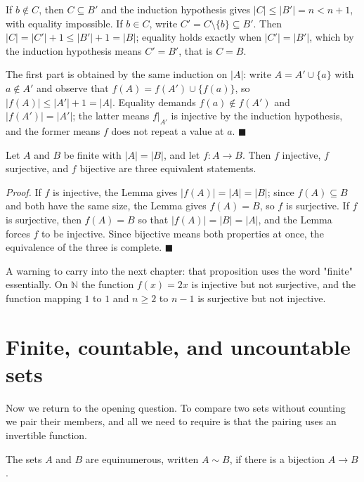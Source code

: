 If $b \notin C$, then $C \subseteq B'$ and the induction hypothesis gives
$|C| \le |B'| = n < n+1$, with equality impossible. If $b \in C$, write
$C' = C \setminus \{b\} \subseteq B'$. Then $|C| = |C'| + 1 \le |B'| + 1 = |B|$;
equality holds exactly when $|C'| = |B'|$, which by the induction hypothesis means
$C' = B'$, that is $C = B$.

The first part is obtained by the same induction on $|A|$: write
$A = A' \cup \{a\}$ with $a \notin A'$ and observe that
$f(A) = f(A') \cup \{f(a)\}$, so $|f(A)| \le |A'| + 1 = |A|$. Equality demands
$f(a) \notin f(A')$ and $|f(A')| = |A'|$; the latter means $f|_{A'}$ is injective by
the induction hypothesis, and the former means $f$ does not repeat a value at $a$.
\hfill$\blacksquare${\parfillskip=0pt\par}

\begin{proposisi}
Let $A$ and $B$ be finite with $|A| = |B|$, and let $f : A \to B$. Then $f$
injective, $f$ surjective, and $f$ bijective are three equivalent statements.
\end{proposisi}
\par\smallskip\noindent\textit{Proof.} If $f$ is injective, the Lemma gives
$|f(A)| = |A| = |B|$; since $f(A) \subseteq B$ and both have the same size, the Lemma
gives $f(A) = B$, so $f$ is surjective. If $f$ is surjective, then $f(A) = B$ so that
$|f(A)| = |B| = |A|$, and the Lemma forces $f$ to be injective. Since bijective means
both properties at once, the equivalence of the three is complete.
\hfill$\blacksquare${\parfillskip=0pt\par}

A warning to carry into the next chapter: that proposition uses the word "finite"
essentially. On $\mathbb{N}$ the function $f(x) = 2x$ is injective but not
surjective, and the function mapping $1$ to $1$ and $n \ge 2$ to $n-1$ is surjective
but not injective.

\section{Finite, countable, and uncountable sets}

Now we return to the opening question. To compare two sets without counting we pair
their members, and all we need to require is that the pairing uses an invertible
function.

\begin{definisi}[Equinumerous]
The sets $A$ and $B$ are equinumerous, written $A \sim B$, if there is a bijection
$A \to B$.
\end{definisi}

